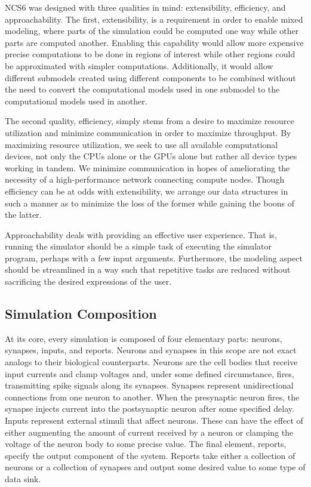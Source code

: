 NCS6 was designed with three qualities in mind: extensibility, efficiency,
and approachability.  The first, extensibility, is a requirement in
order to enable mixed modeling, where parts of the simulation could be
computed one way while other parts are computed another. Enabling this
capability would allow more expensive precise computations to be done
in regions of interest while other regions could be approximated with
simpler computations. Additionally, it would allow different submodels
created using different components to be combined without the need to
convert the computational models used in one submodel to the computational
models used in another.

The second quality, efficiency, simply stems from a desire to maximize
resource utilization and minimize communication in order to maximize
throughput. By maximizing resource utilization, we seek to use
all available computational devices, not only the CPUs alone or the
GPUs alone but rather all device types working in tandem. We minimize
communication in hopes of ameliorating the necessity of a high-performance
network connecting compute nodes. Though efficiency can be at odds with
extensibility, we arrange our data structures in such a manner as to
minimize the loss of the former while gaining the boons of the latter.

Approachability deals with providing an effective user experience. That
is, running the simulator should be a simple task of executing the
simulator program, perhaps with a few input arguments. Furthermore,
the modeling aspect should be streamlined in a way such that repetitive
tasks are reduced without sacrificing the desired expressions of the user.

\subsection{Simulation Composition}

At its core, every simulation is composed of four elementary parts:
neurons, synapses, inputs, and reports. Neurons and synapses in this
scope are not exact analogs to their biological counterparts. Neurons
are the cell bodies that receive input currents and clamp voltages and,
under some defined circumstance, fires, transmitting spike signals
along its synapses. Synapses represent unidirectional connections from
one neuron to another. When the presynaptic neuron fires, the synapse
injects current into the postsynaptic neuron after some specified
delay. Inputs represent external stimuli that affect neurons. These
can have the effect of either augmenting the amount of current received
by a neuron or clamping the voltage of the neuron body to some precise
value. The final element, reports, specify the output component of the
system. Reports take either a collection of neurons or a collection of
synapses and output some desired value to some type of data sink.

